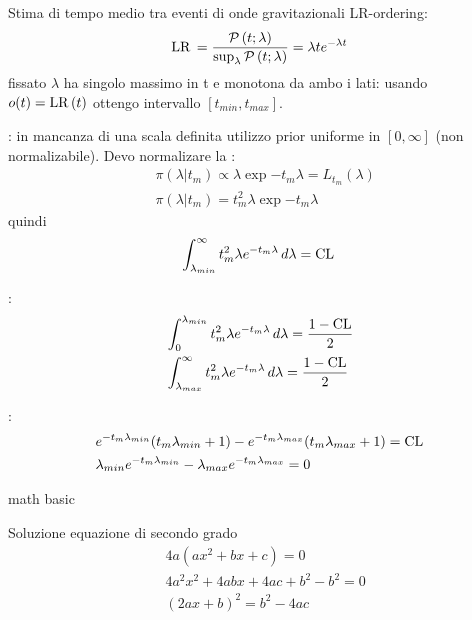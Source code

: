 \begin{wordonframe}{Stima di tempo medio tra eventi di onde gravitazionali}
LR-ordering:
\begin{equation*}
\operatorname{LR}{}=\frac{\operatorname{\mathcal{P}}{(t;\lambda)}}{\sup_{\lambda}\operatorname{\mathcal{P}}{(t;\lambda)}}=\lambda te^{-\lambda t}
\end{equation*}
fissato $\lambda$ ha singolo massimo in t e monotona da ambo i lati: usando $o(t)=\operatorname{LR}{(t)}$ ottengo intervallo $[t_{min},t_{max}]$.

: in mancanza di una scala definita utilizzo prior uniforme in $[0,\infty]$ (non normalizabile). Devo normalizare la :
\begin{align*}
&\pi(\lambda|t_m)\propto \lambda\exp{-t_m\lambda}=L_{t_m}(\lambda)\\
&\pi(\lambda|t_m)=t_m^2\lambda\exp{-t_m\lambda}
\end{align*}
quindi 
\begin{equation*}
\int_{\lambda_{min}}^{\infty}t_m^2\lambda e^{-t_m\lambda}\,d\lambda=\operatorname{CL}{}
\end{equation*}

:
\begin{align*}
&\int_0^{\lambda_{min}}t_m^2\lambda e^{-t_m\lambda}\,d\lambda=\frac{1-\operatorname{CL}}{2}\\
&\int_{\lambda_{max}}^{\infty}t_m^2\lambda e^{-t_m\lambda}\,d\lambda=\frac{1-\operatorname{CL}}{2}
\end{align*}

:
\begin{align*}
&e^{-t_m\lambda_{min}}(t_m\lambda_{min}+1)-e^{-t_m\lambda_{max}}(t_m\lambda_{max}+1)=\operatorname{CL}\\
&\lambda_{min}e^{-t_m\lambda_{min}}-\lambda_{max}e^{-t_m\lambda_{max}}=0
\end{align*}


\end{wordonframe}

\begin{wordonframe}{math basic}
\begin{block}{Soluzione equazione di secondo grado}
\begin{align*}
&4a(ax^2+bx+c)=0\\
&4a^2x^2+4abx+4ac+b^2-b^2=0\\
&(2ax+b)^2=b^2-4ac
\end{align*}
\end{block}

\end{wordonframe}
